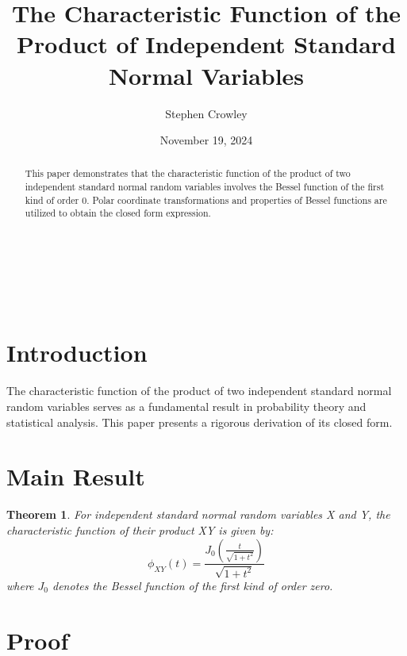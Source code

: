 \documentclass{article}
\newtheorem{theorem}{Theorem}
\begin{document}
\title{The Characteristic Function of the Product of Independent Standard
Normal Variables}

\author{Stephen Crowley}

\date{November 19, 2024}

\maketitle

\

\begin{abstract}
  This paper demonstrates that the characteristic function of the product of
  two independent standard normal random variables involves the Bessel
  function of the first kind of order 0. Polar coordinate transformations and
  properties of Bessel functions are utilized to obtain the closed form
  expression.
\end{abstract}

\

{\tableofcontents}

\section{Introduction}

The characteristic function of the product of two independent standard normal
random variables serves as a fundamental result in probability theory and
statistical analysis. This paper presents a rigorous derivation of its closed
form.

\section{Main Result}

\begin{theorem}
  For independent standard normal random variables X and Y, the characteristic
  function of their product XY is given by:
  \begin{equation}
    \phi_{XY} (t) = \frac{J_0 \left( \frac{t}{\sqrt{1 + t^2}} \right)}{\sqrt{1
    + t^2}}
  \end{equation}
  where $J_0$ denotes the Bessel function of the first kind of order zero.
\end{theorem}

\section{Proof}
\end{document}
